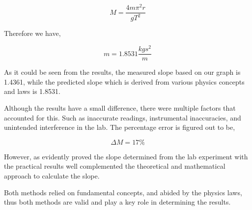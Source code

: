 		$$M = \frac{4m\pi^2 r}{gT^2}$$

	{Therefore we have,}

		$$m = 1.8531 \frac{kgs^2}{m}$$

	{As it could be seen from the results, the measured slope based on our graph is 1.4361, while the predicted slope which is derived from various physics concepts and laws is 1.8531.}
	
	{Although the results have a small difference, there were multiple factors that accounted for this. Such as inaccurate readings, instrumental inaccuracies, and unintended interference in the lab. The percentage error is figured out to be,}

		$$\Delta M = 17\%$$

	{However, as evidently proved the slope determined from the lab experiment with the practical results well complemented the theoretical and mathematical approach to calculate the slope.}
	
	{Both methods relied on fundamental concepts, and abided by the physics laws, thus both methods are valid and play a key role in determining the results.}